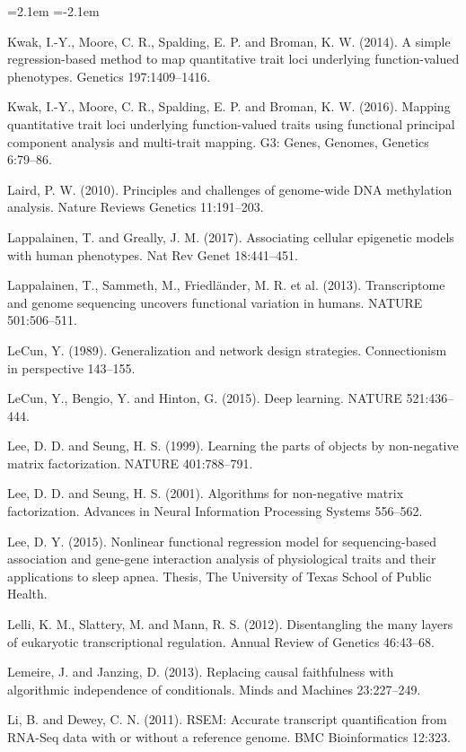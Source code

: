 \begin{list}{}{\leftmargin=2.1em  
  \itemindent=-2.1em \parsep=0pt \itemsep=2pt \topsep=0pt}
\item Kwak, I.-Y., Moore, C. R., Spalding, E. P. and Broman, K. W. (2014). A simple regression-based method to map quantitative trait loci underlying function-valued phenotypes. Genetics 197:1409--1416.
\item Kwak, I.-Y., Moore, C. R., Spalding, E. P. and Broman, K. W. (2016). Mapping quantitative trait loci underlying function-valued traits using functional principal component analysis and multi-trait mapping. G3: Genes, Genomes, Genetics 6:79--86.
\item Laird, P. W. (2010). Principles and challenges of genome-wide DNA methylation analysis. Nature Reviews Genetics 11:191--203.
\item Lappalainen, T. and Greally, J. M. (2017). Associating cellular epigenetic models with human phenotypes. Nat Rev Genet 18:441--451.
\item Lappalainen, T., Sammeth, M., Friedländer, M. R. et al. (2013). Transcriptome and genome sequencing uncovers functional variation in humans. NATURE 501:506--511.
\item LeCun, Y. (1989). Generalization and network design strategies. Connectionism in perspective 143--155.
\item LeCun, Y., Bengio, Y. and Hinton, G. (2015). Deep learning. NATURE 521:436--444.
\item Lee, D. D. and Seung, H. S. (1999). Learning the parts of objects by non-negative matrix factorization. NATURE 401:788--791.
\item Lee, D. D. and Seung, H. S. (2001). Algorithms for non-negative matrix factorization. Advances in Neural Information Processing Systems 556--562.
\item Lee, D. Y. (2015). Nonlinear functional regression model for sequencing-based association and gene-gene interaction analysis of physiological traits and their applications to sleep apnea. Thesis, The University of Texas School of Public Health.
\item Lelli, K. M., Slattery, M. and Mann, R. S. (2012). Disentangling the many layers of eukaryotic transcriptional regulation. Annual Review of Genetics 46:43--68.
\item Lemeire, J. and Janzing, D. (2013). Replacing causal faithfulness with algorithmic independence of conditionals. Minds and Machines 23:227--249.
\item Li, B. and Dewey, C. N. (2011). RSEM: Accurate transcript quantification from RNA-Seq data with or without a reference genome. BMC Bioinformatics 12:323.

\end{list}
